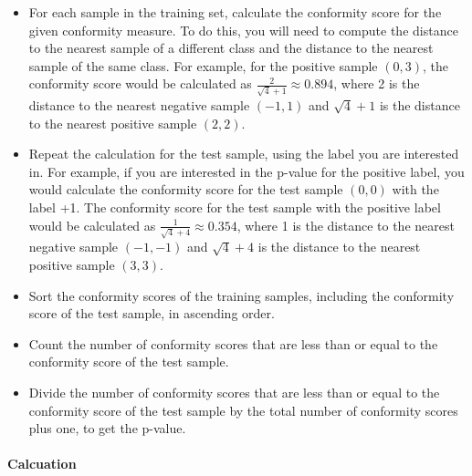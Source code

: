 \begin{itemize}
	\item For each sample in the training set, calculate the conformity score for the given conformity measure. To do this, you will need to compute the distance to the nearest sample of a different class and the distance to the nearest sample of the same class. For example, for the positive sample $(0, 3)$, the conformity score would be calculated as $\frac{2}{\sqrt{4} + 1} \approx 0.894$, where 2 is the distance to the nearest negative sample $(-1, 1)$ and $\sqrt{4} + 1$ is the distance to the nearest positive sample $(2, 2)$.
	\item Repeat the calculation for the test sample, using the label you are interested in. For example, if you are interested in the p-value for the positive label, you would calculate the conformity score for the test sample $(0, 0)$ with the label +1. The conformity score for the test sample with the positive label would be calculated as $\frac{1}{\sqrt{4} + 4} \approx 0.354$, where 1 is the distance to the nearest negative sample $(-1, -1)$ and $\sqrt{4} + 4$ is the distance to the nearest positive sample $(3, 3)$.
	\item Sort the conformity scores of the training samples, including the conformity score of the test sample, in ascending order.
	\item Count the number of conformity scores that are less than or equal to the conformity score of the test sample.
	\item Divide the number of conformity scores that are less than or equal to the conformity score of the test sample by the total number of conformity scores plus one, to get the p-value.
\end{itemize}

\paragraph{Calcuation}
